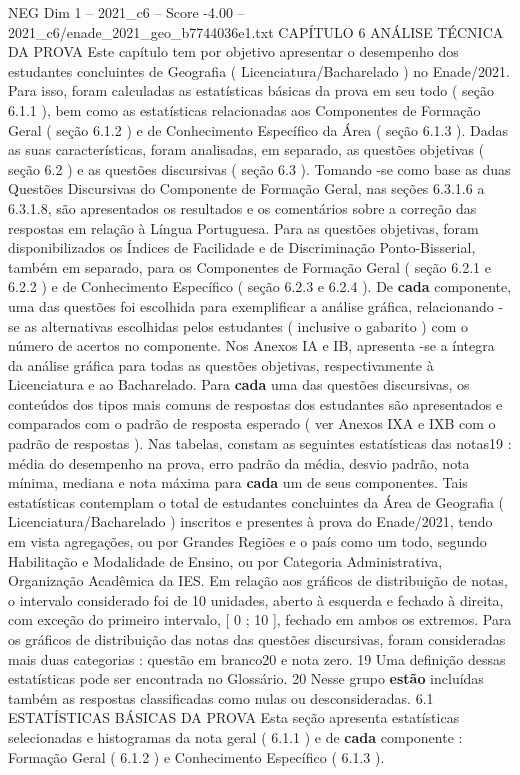 \begin{textsample}{NEG Dim 1 – 2021\_c6 – Score -4.00 – 2021\_c6/enade\_2021\_geo\_b7744036e1.txt}  \label{ex:f1_neg_233}
CAPÍTULO 6 ANÁLISE TÉCNICA DA PROVA Este capítulo tem por objetivo apresentar o desempenho dos estudantes concluintes de Geografia ( Licenciatura/Bacharelado ) no Enade/2021.
Para isso, foram calculadas as estatísticas básicas da prova em seu todo ( seção 6.1.1 ), bem como as estatísticas relacionadas aos Componentes de Formação Geral ( seção 6.1.2 ) e de Conhecimento Específico da Área ( seção 6.1.3 ).
Dadas as suas características, foram analisadas, em separado, as questões objetivas ( seção 6.2 ) e as questões discursivas ( seção 6.3 ).
Tomando -se como base as duas Questões Discursivas do Componente de Formação Geral, nas seções 6.3.1.6 a 6.3.1.8, são apresentados os resultados e os comentários sobre a correção das respostas em relação à Língua Portuguesa.
Para as questões objetivas, foram disponibilizados os Índices de Facilidade e de Discriminação Ponto-Bisserial, também em separado, para os Componentes de Formação Geral ( seção 6.2.1 e 6.2.2 ) e de Conhecimento Específico ( seção 6.2.3 e 6.2.4 ).
De \textbf{cada} componente, uma das questões foi escolhida para exemplificar a análise gráfica, relacionando -se as alternativas escolhidas pelos estudantes ( inclusive o gabarito ) com o número de acertos no componente.
Nos Anexos IA e IB, apresenta -se a íntegra da análise gráfica para todas as questões objetivas, respectivamente à Licenciatura e ao Bacharelado.
Para \textbf{cada} uma das questões discursivas, os conteúdos dos tipos mais comuns de respostas dos estudantes são apresentados e comparados com o padrão de resposta esperado ( ver Anexos IXA e IXB com o padrão de respostas ).
Nas tabelas, constam as seguintes estatísticas das notas19 : média do desempenho na prova, erro padrão da média, desvio padrão, nota mínima, mediana e nota máxima para \textbf{cada} um de seus componentes.
Tais estatísticas contemplam o total de estudantes concluintes da Área de Geografia ( Licenciatura/Bacharelado ) inscritos e presentes à prova do Enade/2021, tendo em vista agregações, ou por Grandes Regiões e o país como um todo, segundo Habilitação e Modalidade de Ensino, ou por Categoria Administrativa, Organização Acadêmica da IES.
Em relação aos gráficos de distribuição de notas, o intervalo considerado foi de 10 unidades, aberto à esquerda e fechado à direita, com exceção do primeiro intervalo, [ 0 ; 10 ], fechado em ambos os extremos.
Para os gráficos de distribuição das notas das questões discursivas, foram consideradas mais duas categorias : questão em branco20 e nota zero. 19 Uma definição dessas estatísticas pode ser encontrada no Glossário. 20 Nesse grupo \textbf{estão} incluídas também as respostas classificadas como nulas ou desconsideradas. 6.1 ESTATÍSTICAS BÁSICAS DA PROVA Esta seção apresenta estatísticas selecionadas e histogramas da nota geral ( 6.1.1 ) e de \textbf{cada} componente : Formação Geral ( 6.1.2 ) e Conhecimento Específico ( 6.1.3 ).

\end{textsample}

